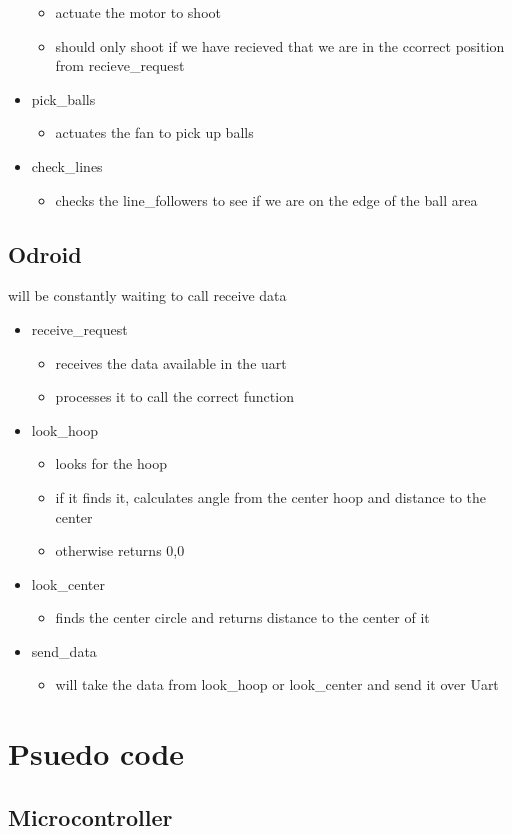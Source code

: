 \documentclass{article}
\begin{document}
\begin{itemize}
        \begin{itemize}
            \item actuate the motor to shoot
            \item should only shoot if we have recieved that we are in the ccorrect position from recieve\_request
        \end{itemize}
    \item pick\_balls
        \begin{itemize}
            \item actuates the fan to pick up balls
        \end{itemize}
    \item check\_lines
        \begin{itemize}
            \item checks the line\_followers to see if we are on the edge of the ball area
        \end{itemize}
\end{itemize}

\subsection*{Odroid}
will be constantly waiting to call receive data
\begin{itemize}
    \item receive\_request
        \begin{itemize}
            \item receives the data available in the uart
            \item processes it to call the correct function
        \end{itemize}
    \item look\_hoop
        \begin{itemize}
            \item looks for the hoop
            \item if it finds it, calculates angle from the center hoop and distance to the center
            \item otherwise returns 0,0
        \end{itemize}
    \item look\_center
        \begin{itemize}
            \item finds the center circle and returns distance to the center of it
        \end{itemize}
    \item send\_data
        \begin{itemize}
            \item will take the data from look\_hoop or look\_center and send it over Uart
        \end{itemize}
\end{itemize}


\section*{Psuedo code}
\subsection*{Microcontroller}
\begin{lstlisting}

\end{lstlisting}
\end{document}
